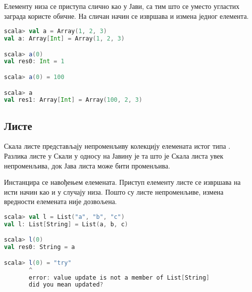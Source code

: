 \documentclass[12pt,oneside]{memoir}
\begin{document}

Елементу низа се приступа слично као у Јави, са тим што се уместо угластих заграда користе обичне. На сличан начин се извршава и измена једног елемента.

\begin{lstlisting}[language=Scala, caption={Приступ и измена елемента низа}, label={lst:scala_coll_array_get_set}, basicstyle=\small]
scala> val a = Array(1, 2, 3)
val a: Array[Int] = Array(1, 2, 3)

scala> a(0)
val res0: Int = 1

scala> a(0) = 100

scala> a
val res1: Array[Int] = Array(100, 2, 3)
\end{lstlisting}

\subsection{Листе}
\label{subsec:scala_lists}

Скала листе представљају непроменљиву колекцију елемената истог типа \cite{scala_prog}. Разлика листе у Скали у односу на Јавину је та што је Скала листа увек непроменљива, док Јава листа може бити променљива. 

Инстанцира се навођењем елемената. Приступ елементу листе се извршава на исти начин као и у случају низа. Пошто су листе непроменљиве, измена вредности елемената није дозвољена.

\begin{lstlisting}[language=Scala, caption={Пример листе у Скали}, label={lst:scala_coll_lists_example}, basicstyle=\small]
scala> val l = List("a", "b", "c")
val l: List[String] = List(a, b, c)

scala> l(0)
val res0: String = a

scala> l(0) = "try"
       ^
       error: value update is not a member of List[String]
       did you mean updated?
\end{lstlisting}

\end{document}
